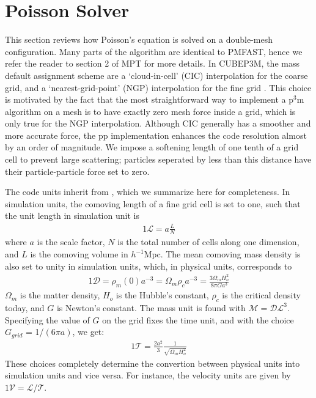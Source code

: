 \section{Poisson Solver}
\label{sec:Poisson}


This section reviews how Poisson's equation is solved on a double-mesh configuration. 
Many parts of the algorithm are identical to {\small PMFAST}, hence we refer the reader 
to section 2 of MPT for more details. In {\small CUBEP3M}, the mass default assignment scheme are
a `cloud-in-cell' (CIC) interpolation for the coarse grid,  and a `nearest-grid-point' (NGP) interpolation 
for the fine grid \citep{1981csup.book.....H}. This choice is motivated by the fact that the most straightforward 
way to implement a p$^3$m algorithm on a mesh is to have exactly zero mesh force inside a grid, 
which is only true for the NGP interpolation. Although CIC generally has a smoother and more accurate force,
the pp implementation enhances the code resolution almost by an order of magnitude. 
We impose a softening length of one tenth of a grid cell to prevent
large scattering; particles seperated by less than this distance have their 
particle-particle force set to zero.

The code units inherit from \citep{2004NewA....9..443T}, which we summarize here for completeness.
In simulation units,  the comoving length of a fine grid cell is set to one,
such that the unit length in simulation unit is 
\begin{eqnarray}
1\mathcal{L} = a \frac{L}{N} 
\end{eqnarray}
where $a$ is the scale factor, $N$ is the total number of cells along one dimension,
and $L$ is the comoving volume in $h^{-1}\mbox{Mpc}$.
The mean comoving mass density is also set to unity in simulation units, 
which, in physical units, corresponds to 
\begin{eqnarray}
1\mathcal{D} = \rho_{m}(0) a^{-3} = \Omega_{m} \rho_{c} a^{-3} = \frac{3 \Omega_{m} H_{o}^{2}}{8 \pi G a^{3} }
\end{eqnarray}
$\Omega_{m}$ is the matter density, $H_{o}$ is the Hubble's constant, $\rho_{c}$ is the critical density today,
and $G$ is Newton's constant. The mass unit is found with $\mathcal{M} = \mathcal{DL}^{3}$.
Specifying the value of $G$ on the grid fixes the time unit, and with the choice $G_{grid}$ = 1/$(6 \pi a)$,
we get:
\begin{eqnarray}
1 \mathcal{T} = \frac{2a^{2}}{3}\frac{1}{\sqrt{\Omega_{m}H_{o}^{2}}}
\end{eqnarray}
These choices completely determine the convertion between physical units into simulation units and vice versa.
For instance, the velocity units are given by $1\mathcal{V} = \mathcal{L}$/$\mathcal{T}$.



